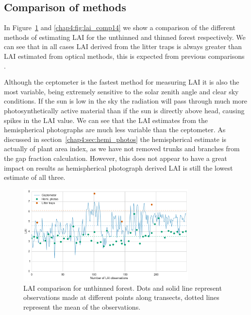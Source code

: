 \subsection{Comparison of methods} \label{chap4:sec:lai_comp}

In Figure~\ref{chap4:fig:lai_comp07} and \ref{chap4:fig:lai_comp14} we show a comparison of the different methods of estimating LAI for the unthinned and thinned forest respectively. We can see that in all cases LAI derived from the litter traps is always greater than LAI estimated from optical methods, this is expected from previous comparisons \citep{breda2003ground}.
 
Although the ceptometer is the fastest method for measuring LAI it is also the most variable, being extremely sensitive to the solar zenith angle and clear sky conditions. If the sun is low in the sky the radiation will pass through much more photosynthetically active material than if the sun is directly above head, causing spikes in the LAI value. We can see that the LAI estimates from the hemispherical photographs are much less variable than the ceptometer. As discussed in section~\ref{chap4:sec:hemi_photos} the hemispherical estimate is actually of plant area index, as we have not removed trunks and branches from the gap fraction calculation. However, this does not appear to have a great impact on results as hemispherical photograph derived LAI is still the lowest estimate of all three. 

\begin{figure}[ht]
    \centering
    \includegraphics[width=0.8\textwidth]{chapter/chapter4/thinned07.pdf}
    \caption{LAI comparison for unthinned forest. Dots and solid line represent observations made at different points along transects, dotted lines represent the mean of the observations.} \label{chap4:fig:lai_comp07}
\end{figure}

